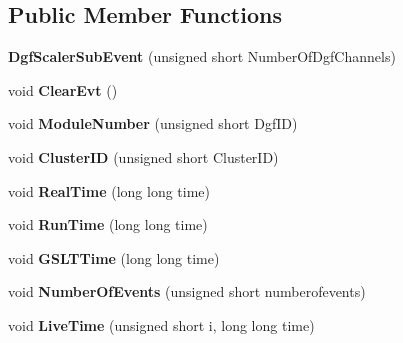 \subsection*{Public Member Functions}
\begin{DoxyCompactItemize}
\item 
\hypertarget{class_dgf_scaler_sub_event_ac65cb699d5b4871413b3c002f7b73f5a}{{\bfseries Dgf\-Scaler\-Sub\-Event} (unsigned short Number\-Of\-Dgf\-Channels)}\label{class_dgf_scaler_sub_event_ac65cb699d5b4871413b3c002f7b73f5a}

\item 
\hypertarget{class_dgf_scaler_sub_event_ad0b0f669bbcc04e4b36bcdc4805f192a}{void {\bfseries Clear\-Evt} ()}\label{class_dgf_scaler_sub_event_ad0b0f669bbcc04e4b36bcdc4805f192a}

\item 
\hypertarget{class_dgf_scaler_sub_event_ac922696259ea41870006d5be47874b37}{void {\bfseries Module\-Number} (unsigned short Dgf\-I\-D)}\label{class_dgf_scaler_sub_event_ac922696259ea41870006d5be47874b37}

\item 
\hypertarget{class_dgf_scaler_sub_event_a0b7123702ce75e4a63c361a8aa6175a1}{void {\bfseries Cluster\-I\-D} (unsigned short Cluster\-I\-D)}\label{class_dgf_scaler_sub_event_a0b7123702ce75e4a63c361a8aa6175a1}

\item 
\hypertarget{class_dgf_scaler_sub_event_a275332fa9b50f56b22309a49d2ee3079}{void {\bfseries Real\-Time} (long long time)}\label{class_dgf_scaler_sub_event_a275332fa9b50f56b22309a49d2ee3079}

\item 
\hypertarget{class_dgf_scaler_sub_event_a597eab29b76c324a155680013ffddd8b}{void {\bfseries Run\-Time} (long long time)}\label{class_dgf_scaler_sub_event_a597eab29b76c324a155680013ffddd8b}

\item 
\hypertarget{class_dgf_scaler_sub_event_ac96a965870e1ce824fab2996c2ab84fc}{void {\bfseries G\-S\-L\-T\-Time} (long long time)}\label{class_dgf_scaler_sub_event_ac96a965870e1ce824fab2996c2ab84fc}

\item 
\hypertarget{class_dgf_scaler_sub_event_a62292d645d559bea309ba1016c247429}{void {\bfseries Number\-Of\-Events} (unsigned short numberofevents)}\label{class_dgf_scaler_sub_event_a62292d645d559bea309ba1016c247429}

\item 
\hypertarget{class_dgf_scaler_sub_event_ab1b1268e16fc5e7b425fd99becb00c01}{void {\bfseries Live\-Time} (unsigned short i, long long time)}\label{class_dgf_scaler_sub_event_ab1b1268e16fc5e7b425fd99becb00c01}


\end{DoxyCompactItemize}

